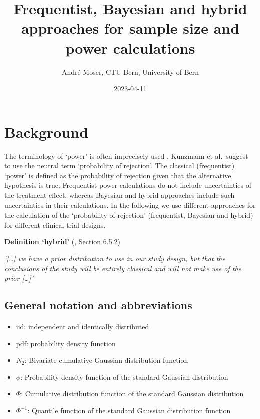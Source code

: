 \documentclass[
]{book}
\title{Frequentist, Bayesian and hybrid approaches for sample size and power calculations}
\author{André Moser, CTU Bern, University of Bern}
\date{2023-04-11}
\providecommand{\tightlist}{%
  \setlength{\itemsep}{0pt}\setlength{\parskip}{0pt}}
\begin{document}
\maketitle

{
\setcounter{tocdepth}{1}
\tableofcontents
}
\hypertarget{background}{%
\chapter{Background}\label{background}}

The terminology of `power' is often imprecisely used \citet{Kunzmann2022}. Kunzmann et al.~suggest to use the neutral term `probability of rejection'. The classical (frequentist) `power' is defined as the probability of rejection given that the alternative hypothesis is true. Frequentist power calculations do not include uncertainties of the treatment effect, whereas Bayesian and hybrid approaches include such uncertainties in their calculations. In the following we use different approaches for the calculation of the `probability of rejection' (frequentist, Bayesian and hybrid) for different clinical trial designs.

\textbf{Definition `hybrid'} (\citet{Spiegelhalter2003}, Section 6.5.2)

\emph{`{[}\ldots{]} we have a prior distribution to use in our study design, but that the conclusions of the study will be entirely classical and will not make use of the prior {[}\ldots{]}'}

\hypertarget{general-notation-and-abbreviations}{%
\section{General notation and abbreviations}\label{general-notation-and-abbreviations}}

\begin{itemize}
\tightlist
\item
  iid: independent and identically distributed
\item
  pdf: probability density function
\item
  \(N_2\): Bivariate cumulative Gaussian distribution function
\item
  \(\phi\): Probability density function of the standard Gaussian distribution
\item
  \(\Phi\): Cumulative distribution function of the standard Gaussian distribution
\item
  \(\Phi^{-1}\): Quantile function of the standard Gaussian distribution function
\end{itemize}
\end{document}
